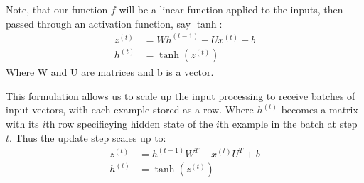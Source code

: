 \documentclass[12pt]{article}
\begin{document}
Note, that our function $f$ will be a linear function applied to the inputs, then passed through an activation function, say $\tanh$:
\begin{align*}
    z^{(t)} &= Wh^{(t-1)} + Ux^{(t)} + b \\
    h^{(t)} &= \tanh(z^{(t)})
\end{align*}
Where W and U are matrices and b is a vector.


This formulation allows us to scale up the input processing to receive batches of input vectors, with each example stored as a row. Where $h^{(t)}$ becomes a matrix with its $i$th row
specificying hidden state of the $i$th example in the batch at step $t$. Thus the update step scales up to:
\begin{align*}
    z^{(t)} &= h^{(t-1)}W^T + x^{(t)}U^T + b \\
    h^{(t)} &= \tanh(z^{(t)})
\end{align*}
\end{document}
